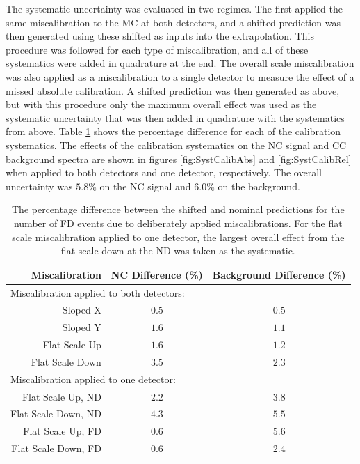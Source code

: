 The systematic uncertainty was evaluated in two regimes. The first applied the same miscalibration to the MC at both detectors, and a shifted prediction was then generated using these shifted as inputs into the extrapolation. This procedure was followed for each type of miscalibration, and all of these systematics were added in quadrature at the end. The overall scale miscalibration was also applied as a miscalibration to a single detector to measure the effect of a missed absolute calibration. A shifted prediction was then generated as above, but with this procedure only the maximum overall effect was used as the systematic uncertainty that was then added in quadrature with the systematics from above. Table \ref{tab:SystCalib} shows the percentage difference for each of the calibration systematics. The effects of the calibration systematics on the NC signal and CC background spectra are shown in figures \ref{fig:SystCalibAbs} and \ref{fig:SystCalibRel} when applied to both detectors and one detector, respectively. The overall uncertainty was $5.8\%$ on the NC signal and $6.0\%$ on the background.
\begin{table}[htb]
  \begin{center}
    \begin{tabular}{r c c}
      \hline\hline
      Miscalibration & NC Difference (\%) & Background Difference (\%) \\
      \hline
      \multicolumn{3}{l}{Miscalibration applied to both detectors:} \\
      Sloped X & $0.5$ & $0.5$ \\
      Sloped Y & $1.6$ & $1.1$ \\
      Flat Scale Up & $1.6$ & $1.2$ \\
      Flat Scale Down & $3.5$ & $2.3$ \\
      \multicolumn{3}{l}{Miscalibration applied to one detector:} \\
      Flat Scale Up, ND & $2.2$ & $3.8$ \\
      Flat Scale Down, ND & $4.3$ & $5.5$ \\
      Flat Scale Up, FD & $0.6$ & $5.6$ \\
      Flat Scale Down, FD & $0.6$ & $2.4$ \\
      \hline
    \end{tabular}
    \caption[Calibration Systematic Uncertainties]{The percentage difference between the shifted and nominal predictions for the number of FD events due to deliberately applied miscalibrations. For the flat scale miscalibration applied to one detector, the largest overall effect from the flat scale down at the ND was taken as the systematic.}
    \label{tab:SystCalib}
  \end{center}
\end{table}


